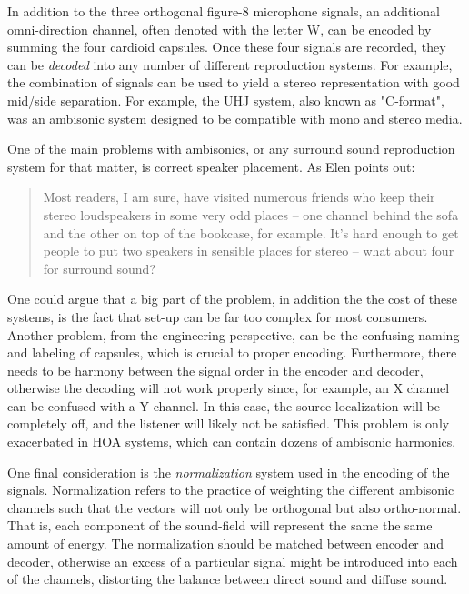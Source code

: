 In addition to the three orthogonal figure-8 microphone signals, an additional omni-direction channel, often denoted with the letter W, can be encoded by summing the four cardioid capsules. Once these four signals are recorded, they can be \textit{decoded} into any number of different reproduction systems. For example, the combination of signals can be used to yield a stereo representation with good mid/side separation. For example, the UHJ system, also known as "C-format", was an ambisonic system designed to be compatible with mono and stereo media. 

One of the main problems with ambisonics, or any surround sound reproduction system for that matter, is correct speaker placement. As Elen \cite{elen1991whatever} points out:

\begin{quote}
    Most readers, I am sure, have visited numerous friends who keep their stereo loudspeakers in some very odd places -- one channel behind the sofa and the other on top of the bookcase, for example. It’s hard enough to get people to put two speakers in sensible places for stereo -- what about four for surround sound?
\end{quote}

One could argue that a big part of the problem, in addition the the cost of these systems, is the fact that set-up can be far too complex for most consumers. Another problem, from the engineering perspective, can be the confusing naming and labeling of capsules, which is crucial to proper encoding. Furthermore, there needs to be harmony between the signal order in the encoder and decoder, otherwise the decoding will not work properly since, for example, an X channel can be confused with a Y channel. In this case, the source localization will be completely off, and the listener will likely not be satisfied. This problem is only exacerbated in HOA systems, which can contain dozens of ambisonic harmonics. 

One final consideration is the \textit{normalization} system used in the encoding of the signals. Normalization refers to the practice of weighting the different ambisonic channels such that the vectors will not only be orthogonal but also ortho-normal. That is, each component of the sound-field will represent the same the same amount of energy. The normalization should be matched between encoder and decoder, otherwise an excess of a particular signal might be introduced into each of the channels, distorting the balance between direct sound and diffuse sound. 

